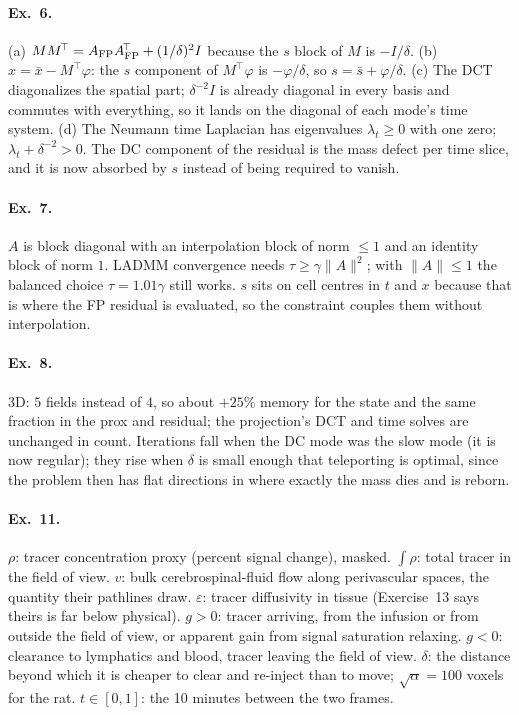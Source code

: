 \documentclass[11pt]{article}
\newcommand{\eps}{\varepsilon}
\newcounter{ex}
\begin{document}
\paragraph{Ex.\ 6.} (a) $MM^{\!\top}=A_{\rm FP}A_{\rm FP}^{\!\top}+(1/\delta)^2I$ because the
$s$ block of $M$ is $-I/\delta$. (b) $x=\bar x-M^{\!\top}\varphi$: the $s$ component of
$M^{\!\top}\varphi$ is $-\varphi/\delta$, so $s=\bar s+\varphi/\delta$. (c) The DCT
diagonalizes the spatial part; $\delta^{-2}I$ is already diagonal in every basis and
commutes with everything, so it lands on the diagonal of each mode's time system. (d) The
Neumann time Laplacian has eigenvalues $\lambda_t\ge0$ with one zero; $\lambda_t+\delta^{-2}>0$.
The DC component of the residual is the mass defect per time slice, and it is now absorbed
by $s$ instead of being required to vanish.

\paragraph{Ex.\ 7.} $A$ is block diagonal with an interpolation block of norm $\le1$ and an
identity block of norm $1$. LADMM convergence needs $\tau\ge\gamma\|A\|^2$; with $\|A\|\le1$
the balanced choice $\tau=1.01\gamma$ still works. $s$ sits on cell centres in $t$ and $x$
because that is where the FP residual is evaluated, so the constraint couples them without
interpolation.

\paragraph{Ex.\ 8.} 3D: $5$ fields instead of $4$, so about $+25\%$ memory for the state and
the same fraction in the prox and residual; the projection's DCT and time solves are
unchanged in count. Iterations fall when the DC mode was the slow mode (it is now regular);
they rise when $\delta$ is small enough that teleporting is optimal, since the problem then
has flat directions in where exactly the mass dies and is reborn.

\paragraph{Ex.\ 11.} $\rho$: tracer concentration proxy (percent signal change), masked.
$\int\rho$: total tracer in the field of view. $v$: bulk cerebrospinal-fluid flow along
perivascular spaces, the quantity their pathlines draw. $\eps$: tracer diffusivity in
tissue (Exercise~13 says theirs is far below physical). $g>0$: tracer arriving, from the
infusion or from outside the field of view, or apparent gain from signal saturation
relaxing. $g<0$: clearance to lymphatics and blood, tracer leaving the field of view.
$\delta$: the distance beyond which it is cheaper to clear and re-inject than to move;
$\sqrt\alpha=100$ voxels for the rat. $t\in[0,1]$: the 10 minutes between the two frames.
\end{document}
